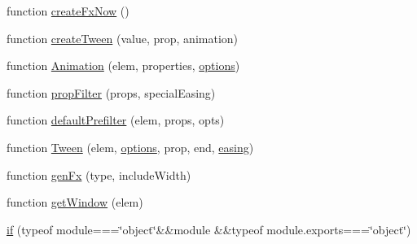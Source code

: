 \begin{DoxyCompactItemize}
function \hyperlink{_scripts_2jquery-1_810_82_8js_a3c7bcef859b0811abb1dbf890c6cc635}{create\+Fx\+Now} ()
\item 
function \hyperlink{_scripts_2jquery-1_810_82_8js_a0c2043fcd2fa684768877127fbbc2e55}{create\+Tween} (value, prop, animation)
\item 
function \hyperlink{_scripts_2jquery-1_810_82_8js_aa33f7dcb8ee41587d545a0bc69849296}{Animation} (elem, properties, \hyperlink{_scripts_2dropzone_8js_a601a442fa75a5a2657a41da857c71b55}{options})
\item 
function \hyperlink{_scripts_2jquery-1_810_82_8js_a0196d1f08ae60b747901b5a2950f72f1}{prop\+Filter} (props, special\+Easing)
\item 
function \hyperlink{_scripts_2jquery-1_810_82_8js_a8041b1040535dcee84ad474aaaf11dde}{default\+Prefilter} (elem, props, opts)
\item 
function \hyperlink{_scripts_2jquery-1_810_82_8js_adcb517ce3709049d37bb5f5bd3811edf}{Tween} (elem, \hyperlink{_scripts_2dropzone_8js_a601a442fa75a5a2657a41da857c71b55}{options}, prop, end, \hyperlink{_scripts_2jquery-1_810_82_8js_a9758a312629fa6de1744280dd6e6253b}{easing})
\item 
function \hyperlink{_scripts_2jquery-1_810_82_8js_a0dad9ae6c57fd32a071de202faa87081}{gen\+Fx} (type, include\+Width)
\item 
function \hyperlink{_scripts_2jquery-1_810_82_8js_ab8e6e1fb3b8b51b6afe437c63df0e09f}{get\+Window} (elem)
\item 
\hyperlink{_scripts_2jquery-1_810_82_8js_aa2cebb51f03a2e3ab2af45a3f9241c96}{if} (typeof module===\char`\"{}object\char`\"{}\&\&module \&\&typeof module.\+exports===\char`\"{}object\char`\"{})
\end{DoxyCompactItemize}
